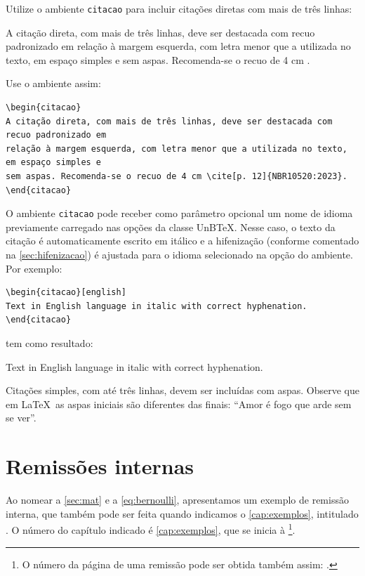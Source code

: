 Utilize o ambiente \texttt{citacao} para incluir citações diretas com mais de três linhas:
\begin{citacao}
A citação direta, com mais de três linhas, deve ser destacada com recuo padronizado em relação à margem esquerda, com letra menor que a utilizada no texto, em espaço simples e sem aspas. Recomenda-se o recuo de 4 cm \cite[p. 12]{NBR10520:2023}.
\end{citacao}

Use o ambiente assim:
\begin{verbatim}
\begin{citacao}
A citação direta, com mais de três linhas, deve ser destacada com recuo padronizado em 
relação à margem esquerda, com letra menor que a utilizada no texto, em espaço simples e 
sem aspas. Recomenda-se o recuo de 4 cm \cite[p. 12]{NBR10520:2023}.
\end{citacao}
\end{verbatim}

O ambiente \texttt{citacao} pode receber como parâmetro opcional um nome de idioma previamente carregado nas opções da classe UnB\TeX. Nesse caso, o texto da citação é automaticamente escrito em itálico e a hifenização (conforme comentado na \cref{sec:hifenizacao}) é ajustada para o idioma selecionado na opção do ambiente. Por exemplo:
\begin{verbatim}
\begin{citacao}[english]
Text in English language in italic with correct hyphenation.
\end{citacao}
\end{verbatim}
tem como resultado:
\begin{citacao}[english]
Text in English language in italic with correct hyphenation.
\end{citacao}

Citações simples, com até três linhas, devem ser incluídas com aspas. Observe que em \LaTeX\ as aspas iniciais são diferentes das finais: ``Amor é fogo que arde sem se ver''.

\section{Remissões internas}

Ao nomear a \cref{sec:mat} e a \cref{eq:bernoulli}, apresentamos um exemplo de remissão interna, que também pode ser feita quando indicamos o \cref{cap:exemplos}, intitulado \emph{}. O número do capítulo indicado é \ref{cap:exemplos}, que se inicia à \footnote{O número da página de uma remissão pode ser obtida também assim: \pageref{cap:exemplos}.}.

